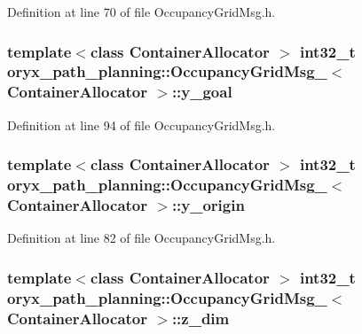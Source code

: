 \-Definition at line 70 of file \-Occupancy\-Grid\-Msg.\-h.

\subsubsection[{y\-\_\-goal}]{\setlength{\rightskip}{0pt plus 5cm}template$<$class Container\-Allocator $>$ int32\-\_\-t {\bf oryx\-\_\-path\-\_\-planning\-::\-Occupancy\-Grid\-Msg\-\_\-}$<$ \-Container\-Allocator $>$\-::{\bf y\-\_\-goal}}\label{structoryx__path__planning_1_1OccupancyGridMsg___ae6846604da7700cd7053e6788a9a8510}


\-Definition at line 94 of file \-Occupancy\-Grid\-Msg.\-h.

\subsubsection[{y\-\_\-origin}]{\setlength{\rightskip}{0pt plus 5cm}template$<$class Container\-Allocator $>$ int32\-\_\-t {\bf oryx\-\_\-path\-\_\-planning\-::\-Occupancy\-Grid\-Msg\-\_\-}$<$ \-Container\-Allocator $>$\-::{\bf y\-\_\-origin}}\label{structoryx__path__planning_1_1OccupancyGridMsg___a00650a31d3f8484d4701f272aef0bed7}


\-Definition at line 82 of file \-Occupancy\-Grid\-Msg.\-h.

\subsubsection[{z\-\_\-dim}]{\setlength{\rightskip}{0pt plus 5cm}template$<$class Container\-Allocator $>$ int32\-\_\-t {\bf oryx\-\_\-path\-\_\-planning\-::\-Occupancy\-Grid\-Msg\-\_\-}$<$ \-Container\-Allocator $>$\-::{\bf z\-\_\-dim}}\label{structoryx__path__planning_1_1OccupancyGridMsg___a666d97f6cbe1d6341089369596a8eb1a}


